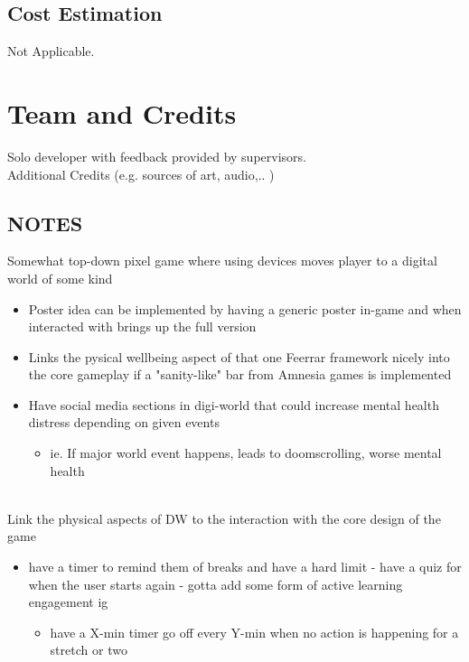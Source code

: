 \documentclass[a4paper]{scrreprt}
\begin{document}
\section{Cost Estimation}
Not Applicable. 



\chapter{Team and Credits}
Solo developer with feedback provided by supervisors.
\\
Additional Credits (e.g. sources of art, audio,.. ) 

\section{NOTES}
Somewhat top-down pixel game where using devices moves player to a digital world of some kind 
\begin{itemize}
\item Poster idea can be implemented by having a generic poster in-game and when interacted with brings up the full version
\item Links the pysical wellbeing aspect of that one Feerrar framework nicely into the core gameplay if a "sanity-like" bar from Amnesia games is implemented
\item Have social media sections in digi-world that could increase mental health distress depending on given events
\begin{itemize}
\item ie. If major world event happens, leads to doomscrolling, worse mental health
\end{itemize}
\end{itemize}\noindent
\\
Link the physical aspects of DW to the interaction with the core design of the game
\begin{itemize}
\item have a timer to remind them of breaks and have a hard limit - have a quiz for when the user starts again - gotta add some form of active learning engagement ig
\begin{itemize}
\item have a X-min timer go off every Y-min when no action is happening for a stretch or two 
\end{itemize}
\end{itemize}\noindent
\\
\end{document}
